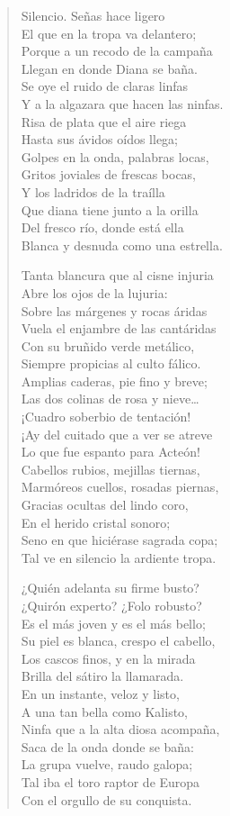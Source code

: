 \documentclass[12pt]{article}
\begin{document}
\begin{verse}
Silencio. Señas hace ligero\\
El que en la tropa va delantero;\\
Porque a un recodo de la campaña\\
Llegan en donde Diana se baña.\\
Se oye el ruido de claras linfas\\
Y a la algazara que hacen las ninfas.\\
Risa de plata que el aire riega\\
Hasta sus ávidos oídos llega;\\
Golpes en la onda, palabras locas,\\
Gritos joviales de frescas bocas,\\
Y los ladridos de la traílla\\
Que diana tiene junto a la orilla\\
Del fresco río, donde está ella\\
Blanca y desnuda como una estrella.  

Tanta blancura que al cisne injuria\\
Abre los ojos de la lujuria:\\
Sobre las márgenes y rocas áridas\\
Vuela el enjambre de las cantáridas\\
Con su bruñido verde metálico,\\
Siempre propicias al culto fálico.\\
Amplias caderas, pie fino y breve;\\
Las dos colinas de rosa y nieve…\\
¡Cuadro soberbio de tentación!\\
¡Ay del cuitado que a ver se atreve\\
Lo que fue espanto para Acteón!\\
Cabellos rubios, mejillas tiernas,\\
Marmóreos cuellos, rosadas piernas,\\
Gracias ocultas del lindo coro,\\
En el herido cristal sonoro;\\
Seno en que hiciérase sagrada copa;\\
Tal ve en silencio la ardiente tropa.  

¿Quién adelanta su firme busto?\\
¿Quirón experto? ¿Folo robusto?\\
Es el más joven y es el más bello;\\
Su piel es blanca, crespo el cabello,\\
Los cascos finos, y en la mirada\\
Brilla del sátiro la llamarada.\\
En un instante, veloz y listo,\\
A una tan bella como Kalisto,\\
Ninfa que a la alta diosa acompaña,\\
Saca de la onda donde se baña:\\
La grupa vuelve, raudo galopa;\\
Tal iba el toro raptor de Europa\\
Con el orgullo de su conquista.  


\end{verse}
\end{document}
